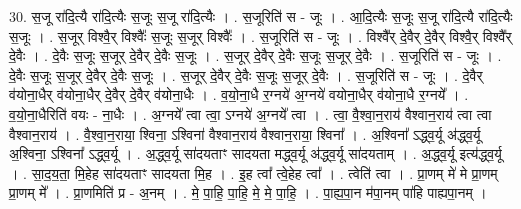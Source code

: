 \documentclass[17pt]{extarticle}
\begin{document}
30. स॒जू रा॑दि॒त्यै रा॑दि॒त्यैः स॒जूः स॒जू रा॑दि॒त्यैः । . स॒जूरिति॑ स - जूः । . आ॒दि॒त्यैः स॒जूः स॒जू रा॑दि॒त्यै रा॑दि॒त्यैः स॒जूः । . स॒जूर् विश्वै॒र् विश्वैः᳚ स॒जूः स॒जूर् विश्वैः᳚ । . स॒जूरिति॑ स - जूः । . विश्वै᳚र् दे॒वैर् दे॒वैर् विश्वै॒र् विश्वै᳚र् दे॒वैः । . दे॒वैः स॒जूः स॒जूर् दे॒वैर् दे॒वैः स॒जूः । . स॒जूर् दे॒वैर् दे॒वैः स॒जूः स॒जूर् दे॒वैः । . स॒जूरिति॑ स - जूः । . दे॒वैः स॒जूः स॒जूर् दे॒वैर् दे॒वैः स॒जूः । . स॒जूर् दे॒वैर् दे॒वैः स॒जूः स॒जूर् दे॒वैः । . स॒जूरिति॑ स - जूः । . दे॒वैर् व॑योना॒धैर् व॑योना॒धैर् दे॒वैर् दे॒वैर् व॑योना॒धैः । . व॒यो॒ना॒धै र॒ग्नये॑ अ॒ग्नये॑ वयोना॒धैर् व॑योना॒धै र॒ग्नये᳚ । . व॒यो॒ना॒धैरिति॑ वयः - ना॒धैः । . अ॒ग्नये᳚ त्वा त्वा॒ ऽग्नये॑ अ॒ग्नये᳚ त्वा । . त्वा॒ वै॒श्वा॒न॒राय॑ वैश्वान॒राय॑ त्वा त्वा वैश्वान॒राय॑ । . वै॒श्वा॒न॒राया॒ श्विना॒ ऽश्विना॑ वैश्वान॒राय॑ वैश्वान॒राया॒ श्विना᳚ । . अ॒श्विना᳚ ऽद्ध्व॒र्यू अ॑द्ध्व॒र्यू अ॒श्विना॒ ऽश्विना᳚ ऽद्ध्व॒र्यू । . अ॒द्ध्व॒र्यू सा॑दयताꣳ सादयता मद्ध्व॒र्यू अ॑द्ध्व॒र्यू सा॑दयताम् । . अ॒द्ध्व॒र्यू इत्य॑द्ध्व॒र्यू । . सा॒द॒य॒ता॒ मि॒हेह सा॑दयताꣳ सादयता मि॒ह । . इ॒ह त्वा᳚ त्वे॒हेह त्वा᳚ । . त्वेति॑ त्वा । . प्रा॒णम् मे॑ मे प्रा॒णम् प्रा॒णम् मे᳚ । . प्रा॒णमिति॑ प्र - अ॒नम् । . मे॒ पा॒हि॒ पा॒हि॒ मे॒ मे॒ पा॒हि॒ । . पा॒ह्य॒पा॒न म॑पा॒नम् पा॑हि पाह्यपा॒नम् । \newline
\end{document}
